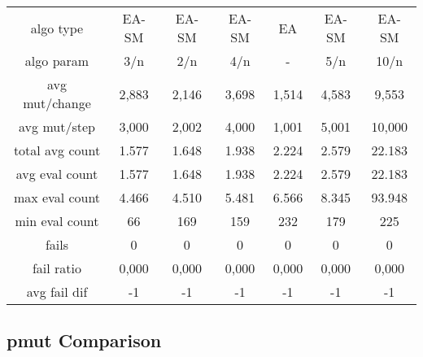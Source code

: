 \begin{tabular}[h]{ccccccc}
algo type&             EA-SM&      EA-SM&      EA-SM&         EA&      EA-SM&      EA-SM\\
algo param&              3/n&        2/n&        4/n&          -&        5/n&       10/n\\
avg mut/change&        2,883&      2,146&      3,698&      1,514&      4,583&      9,553\\
avg mut/step&          3,000&      2,002&      4,000&      1,001&      5,001&     10,000\\
\hline
total avg count&       1.577&      1.648&      1.938&      2.224&      2.579&     22.183\\
avg eval count&        1.577&      1.648&      1.938&      2.224&      2.579&     22.183\\
max eval count&        4.466&      4.510&      5.481&      6.566&      8.345&     93.948\\
min eval count&           66&        169&        159&        232&        179&        225\\
\hline
fails&                     0&          0&          0&          0&          0&          0\\
fail ratio&            0,000&      0,000&      0,000&      0,000&      0,000&      0,000\\
avg fail dif&             -1&         -1&         -1&         -1&         -1&         -1\\
\end{tabular}


\subsection{pmut Comparison}


